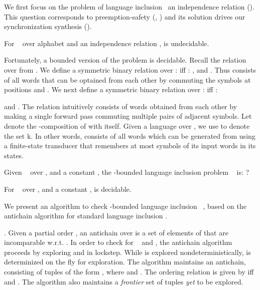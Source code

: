 We first focus on the problem of language inclusion \upto~an independence relation ().  This question corresponds to preemption-safety (, ) and its solution drives our synchronization synthesis ().


\begin{theorem}\label{thm:langinc.undecidable}
For \nfas~ over alphabet  and an independence relation ,  is undecidable\cite{bertoni1982equivalence}.  
\end{theorem} 

Fortunately, a bounded version of the problem is decidable. 
Recall the relation  over  from . 
We define a symmetric binary relation  over :
 iff : 
,  and 
.
Thus  consists of all words that can be optained from each other by commuting 
the symbols at positions  and .
We next define a symmetric binary relation  over : 
 iff : 
 
and .
The relation  intuitively consists of words obtained from each other
by making a single forward pass commuting multiple pairs of adjacent symbols.
Let  denote the -composition of  with itself. 
Given a language  over , 
we use  to denote the set \scriptstyle k.
In other words,  consists of all words which can be generated from 
 using a finite-state transducer that remembers at most  symbols 
of its input words in its states.  

\begin{definition}
Given \nfas~ over ,  and a constant , the -bounded language inclusion problem \upto~ is: ? 
\end{definition}

\begin{theorem}\label{thm:boundlanginc}
For \nfas~ over ,  and a constant ,  
 is decidable. 
\end{theorem}

We present an algorithm to check -bounded language inclusion
\upto~, based on the antichain algorithm for standard language
inclusion \cite{de2006antichains}. 

. 
Given a partial order , an antichain over  is
a set of elements of  that are incomparable w.r.t. . In order
to check  for \nfas~ and ,
the antichain algorithm proceeds by exploring  and  in lockstep.
While  is explored nondeterministically,  is determinized on the fly 
for exploration. The algorithm maintains
an antichain, consisting of tuples of the form , where  and . 
The ordering relation  is given by 
 iff  and . The algorithm also maintains a {\em frontier} set of 
tuples {\em yet} to be explored. 


